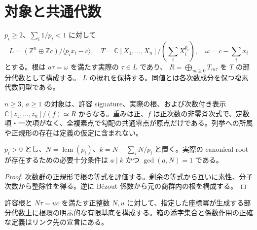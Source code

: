 

\section{対象と共通代数}

\begin{definition}[実際の次数付き根環]
\label{def:root}
\leanok
$p_i\geq2$、$\sum_i1/p_i<1$ に対して
\[L=(\mathbb Z^n\oplus\mathbb Zc)/\langle p_ix_i-c\rangle,\quad
T=\mathbb C[X_1,\ldots,X_n]/(\sum_iX_i^{p_i}),\quad\omega=c-\sum_i x_i\]
とする。根は $a\tau=\omega$ を満たす実際の $\tau\in L$ であり、
$R=\bigoplus_{m\geq0}T_{m\tau}$ を $T$ の部分代数として構成する。
$L$ の捩れを保持する。同値とは各次数成分を保つ複素代数同型である。
\end{definition}

\begin{definition}[列挙器と独立した分類対象]
\label{def:target}
\leanok
{}
$n\geq3$, $a\geq1$ の対象は、許容 signature、実際の根、および次数付き表示 $\mathbb C[z_1,\ldots,z_n]/(f)\simeq R$ からなる。重みは正、$f$ は正次数の非零斉次式で、定数項・一次項がなく、全複素点で勾配の共通零点が原点だけである。列挙への所属や正規形の存在は定義の仮定に含まれない。
\end{definition}

\begin{theorem}[整数次数群内での根の存在]
\label{thm:root-arithmetic}
\leanok
$p_i>0$ とし、$N=\operatorname{lcm}(p_i)$、$k=N-\sum_iN/p_i$ と置く。実際の canonical root が存在するための必要十分条件は $a\mid k$ かつ $\gcd(a,N)=1$ である。
\end{theorem}
\begin{proof}
\leanok
{}
次数群の正規形で根の等式を評価する。剰余の等式から互いに素性、分子次数から整除性を得る。逆に Bézout 係数から元の商群内の根を構成する。
\end{proof}

\begin{definition}[有限自由基底]
\label{def:basis}
\leanok
{}
許容根と $N\tau=uc$ を満たす正整数 $N,u$ に対して、指定した座標冪が生成する部分代数上に根環の明示的な有限基底を構成する。箱の添字集合と係数作用の正確な定義はリンク先の宣言にある。
\end{definition}

